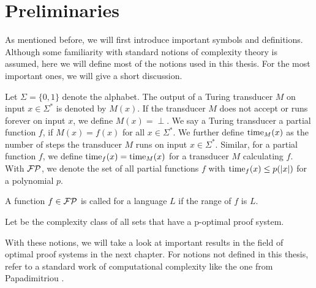\chapter{Preliminaries}
  As mentioned before, we will first introduce important symbols and definitions. Although some familiarity with standard notions of complexity theory is assumed, here we will define most of the notions used in this thesis. For the most important ones, we will give a short discussion.

  Let \(\Sigma = \{ 0, 1 \}\) denote the alphabet. The output of a Turing transducer \(M\) on input \(x \in \Sigma^*\) is denoted by \(M(x)\). If the transducer \(M\) does not accept or runs forever on input \(x\), we define \(M(x) = \perp\). We say a Turing transducer  a partial function \(f\), if \(M(x) = f(x)\) for all \(x \in \Sigma^*\). We further define \(\operatorname{time}_M(x)\) as the number of steps the transducer \(M\) runs on input \(x \in \Sigma^*\). Similar, for a partial function \(f\), we define \(\operatorname{time}_f(x) = \operatorname{time}_M(x)\) for a transducer \(M\) calculating \(f\).  With \(\mathcal{FP}\), we denote the set of all partial functions \(f\) with \(\operatorname{time}_f(x) \leq p(|x|)\) for a polynomial \(p\).

  \begin{definition}
    A function \(f \in \mathcal{FP}\) is called  for a language \(L\) if the range of \(f\) is \(L\).
  \end{definition}

  \begin{definition}[OPT]
    Let  be the complexity class of all sets that have a p-optimal proof system.
  \end{definition}

  With these notions, we will take a look at important results in the field of optimal proof systems in the next chapter. For notions not defined in this thesis, refer to a standard work of computational complexity like the one from Papadimitriou \cite{Pap94}.


